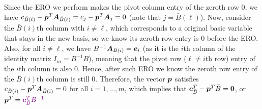 \begin{enumerate}
\begin{pf}
Since the ERO we perform makes the pivot column entry of the zeroth row \(0\),
we have \(c_{\bar{B}(\ell)}-\bm{p}^{T}\bm{A}_{\bar{B}(\ell)}=c_j-\bm{p}^{T}\bm{A}_j=0\)
(note that \(j=\bar{B}(\ell)\)). Now, consider the \(\bar{B}(i)\)th column with
\(i\ne\ell\), which corresponds to a original basic variable that stays in the
new basis, so we know its zeroth row entry is \(0\) before the ERO. Also, for
all \(i\ne\ell\), we have \(B^{-1}\bm{A}_{B(i)}=\bm{e}_i\) (as it is the
\(i\)th column of the identity matrix \(I_m=B^{-1}B\)), meaning that the pivot
row (\(\ell\ne i\)th row) entry of the \(i\)th column is also \(0\). Hence,
after such ERO we know the zeroth row entry of the \(\bar{B}(i)\)th column is
still \(0\). Therefore, the vector \(\bm{p}\) satisfies
\(c_{\bar{B}(i)}-\bm{p}^{T}\bm{A}_{\bar{B}(i)}=0\) for all \(i=1,\dotsc,m\), 
which implies that \(\bm{c}_{\bar{B}}^{T}-\bm{p}^{T}\bar{B}=\bm{0}\), or
\(\vect{p}^{T}=\vc{\vect{c}_{\bar{B}}^{T}\bar{B}^{-1}}\).


\end{pf}
\end{enumerate}
